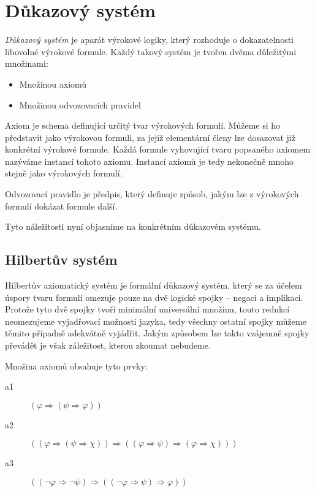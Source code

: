 \documentclass[thesis=B,czech,hidelinks]{FITthesis}[2012/06/26]
\begin{document}
\section{Důkazový systém}

\emph{Důkazový systém} je aparát výrokové logiky, který rozhoduje o dokazatelnosti libovolné výrokové formule. Každý takový systém je tvořen dvěma důležitými množinami:

\begin{itemize}
	\item Množinou axiomů
	\item Množinou odvozovacích pravidel
\end{itemize}

Axiom je schema definující určitý tvar výrokových formulí. Můžeme si ho představit jako výrokovou formuli, za jejíž elementární členy lze dosazovat již konkrétní výrokové formule. Každá formule vyhovující tvaru popsaného axiomem nazýváme instancí tohoto axiomu. Instancí axiomů je tedy nekonečně mnoho stejně jako výrokových formulí.

Odvozovací pravidlo je předpis, který definuje způsob, jakým lze z výrokových formulí dokázat formule další.

Tyto náležitosti nyní objasníme na konkrétním důkazovém systému.

\subsection{Hilbertův systém}

Hilbertův axiomatický systém je formální důkazový systém, který se za účelem úspory tvaru formulí omezuje pouze na dvě logické spojky -- negaci a implikaci. Protože tyto dvě spojky tvoří minimální universální množinu, touto redukcí neomezujeme vyjadřovací možnosti jazyka, tedy všechny ostatní spojky můžeme těmito případně adekvátně vyjádřit\cite{logika}. Jakým způsobem lze takto vzájemně spojky převádět je však záležitost, kterou zkoumat nebudeme.

Množina axiomů obsahuje tyto prvky:

\begin{description}
	\item[a1] $( \varphi \Rightarrow ( \psi \Rightarrow \varphi ))$
	\item[a2] $(( \varphi \Rightarrow ( \psi \Rightarrow \chi )) \Rightarrow (( \varphi \Rightarrow \psi ) \Rightarrow ( \varphi \Rightarrow \chi )))$
	\item[a3] $(( \neg \varphi \Rightarrow \neg \psi ) \Rightarrow (( \neg \varphi \Rightarrow \psi ) \Rightarrow \varphi ))$
\end{description}
\end{document}

